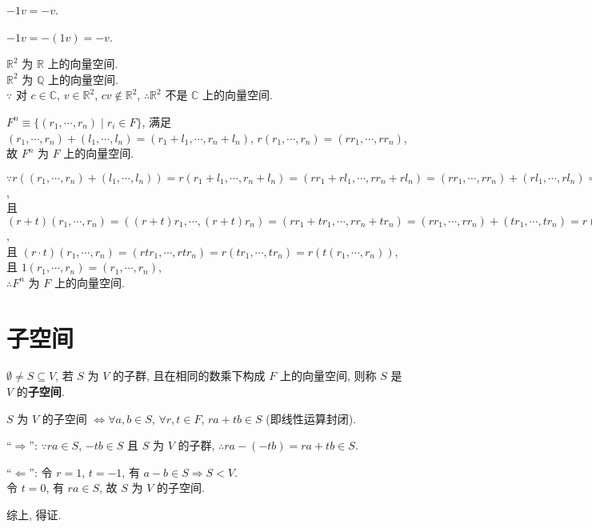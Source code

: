 \documentclass{note}
\begin{document}
$-1v=-v$.
\begin{pf}
    $-1v=-(1v)=-v$.
\end{pf}

\begin{eg}
    $\mathbb{R}^2$ 为 $\mathbb{R}$ 上的向量空间.\\
    $\mathbb{R}^2$ 为 $\mathbb{Q}$ 上的向量空间.\\
    $\because$ 对 $c\in\mathbb{C}$, $v\in\mathbb{R}^2$, $cv\notin\mathbb{R}^2$, $\therefore\mathbb{R}^2$ 不是 $\mathbb{C}$ 上的向量空间.
\end{eg}

\begin{eg}
    $F^n\equiv\{(r_1,\cdots,r_n)\mid r_i\in F\}$, 满足 $(r_1,\cdots,r_n)+(l_1,\cdots,l_n)=(r_1+l_1,\cdots,r_n+l_n)$, $r(r_1,\cdots,r_n)=(rr_1,\cdots,rr_n)$, 故 $F^n$ 为 $F$ 上的向量空间.
\end{eg}
\begin{pf}
    $\because r((r_1,\cdots,r_n)+(l_1,\cdots,l_n))=r(r_1+l_1,\cdots,r_n+l_n)=(rr_1+rl_1,\cdots,rr_n+rl_n)=(rr_1,\cdots,rr_n)+(rl_1,\cdots,rl_n)=r(r_1,\cdots,r_n)+r(l_1,\cdots,l_n)$,\\
    且 $(r+t)(r_1,\cdots,r_n)=((r+t)r_1,\cdots,(r+t)r_n)=(rr_1+tr_1,\cdots,rr_n+tr_n)=(rr_1,\cdots,rr_n)+(tr_1,\cdots,tr_n)=r(r_1,\cdots,r_n)+t(r_1,\cdots,r_n)$,\\
    且 $(r\cdot t)(r_1,\cdots,r_n)=(rtr_1,\cdots,rtr_n)=r(tr_1,\cdots,tr_n)=r(t(r_1,\cdots,r_n))$,\\
    且 $1(r_1,\cdots,r_n)=(r_1,\cdots,r_n)$,\\
    $\therefore F^n$ 为 $F$ 上的向量空间.
\end{pf}

\section{子空间}
\begin{df}[子空间]
    $\emptyset\neq S\subseteq V$, 若 $S$ 为 $V$ 的子群, 且在相同的数乘下构成 $F$ 上的向量空间, 则称 $S$ 是 $V$ 的\textbf{子空间}.
\end{df}

\begin{thm}
    $S$ 为 $V$ 的子空间 $\Longleftrightarrow\forall a,b\in S$, $\forall r,t\in F$, $ra+tb\in S$ (即线性运算封闭).
\end{thm}
\begin{pf}
    ``$\Longrightarrow$'': $\because ra\in S$, $-tb\in S$ 且 $S$ 为 $V$ 的子群, $\therefore ra-(-tb)=ra+tb\in S$.

    ``$\Longleftarrow$'': 令 $r=1$, $t=-1$, 有 $a-b\in S\Longrightarrow S<V$.\\
    令 $t=0$, 有 $ra\in S$, 故 $S$ 为 $V$ 的子空间.

    综上, 得证.
\end{pf}
\end{document}
